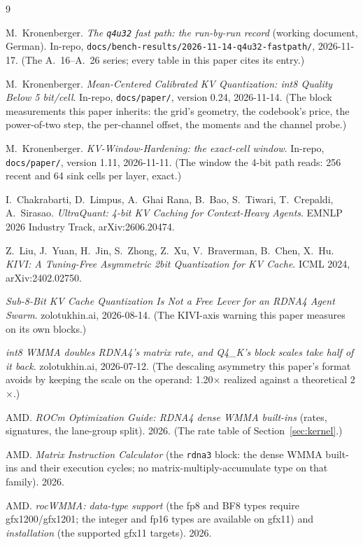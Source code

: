 \documentclass[10pt,twocolumn]{article}
\begin{document}
\begin{thebibliography}{9}

M.~Kronenberger.
\emph{The \texttt{q4u32} fast path: the run-by-run record} (working document, German).
In-repo, \texttt{docs/bench-results/2026-11-14-q4u32-fastpath/}, 2026-11-17.
(The A.~16--A.~26 series; every table in this paper cites its entry.)

M.~Kronenberger.
\emph{Mean-Centered Calibrated KV Quantization: int8 Quality Below 5 bit/cell}.
In-repo, \texttt{docs/paper/}, version 0.24, 2026-11-14.
(The block measurements this paper inherits: the grid's geometry, the codebook's price, the
power-of-two step, the per-channel offset, the moments and the channel probe.)

M.~Kronenberger.
\emph{KV-Window-Hardening: the exact-cell window}.
In-repo, \texttt{docs/paper/}, version 1.11, 2026-11-11.
(The window the 4-bit path reads: 256 recent and 64 sink cells per layer, exact.)

I.~Chakrabarti, D.~Limpus, A.~Ghai Rana, B.~Bao, S.~Tiwari, T.~Crepaldi, A.~Sirasao.
\emph{UltraQuant: 4-bit KV Caching for Context-Heavy Agents}.
EMNLP 2026 Industry Track, arXiv:2606.20474.

Z.~Liu, J.~Yuan, H.~Jin, S.~Zhong, Z.~Xu, V.~Braverman, B.~Chen, X.~Hu.
\emph{KIVI: A Tuning-Free Asymmetric 2bit Quantization for KV Cache}.
ICML 2024, arXiv:2402.02750.

\emph{Sub-8-Bit KV Cache Quantization Is Not a Free Lever for an RDNA4 Agent Swarm}.
zolotukhin.ai, 2026-08-14. (The KIVI-axis warning this paper measures on its own blocks.)

\emph{int8 WMMA doubles RDNA4's matrix rate, and Q4\_K's block scales take half of it back}.
zolotukhin.ai, 2026-07-12. (The descaling asymmetry this paper's format avoids by keeping the scale on
the operand: 1.20$\times$ realized against a theoretical 2$\times$.)

AMD.
\emph{ROCm Optimization Guide: RDNA4 dense WMMA built-ins} (rates, signatures, the lane-group split).
2026. (The rate table of Section~\ref{sec:kernel}.)

AMD.
\emph{Matrix Instruction Calculator} (the \texttt{rdna3} block: the dense WMMA built-ins and their
execution cycles; no matrix-multiply-accumulate type on that family). 2026.

AMD.
\emph{rocWMMA: data-type support} (the fp8 and BF8 types require gfx1200/gfx1201; the integer and fp16
types are available on gfx11) and \emph{installation} (the supported gfx11 targets). 2026.


\end{thebibliography}
\end{document}
